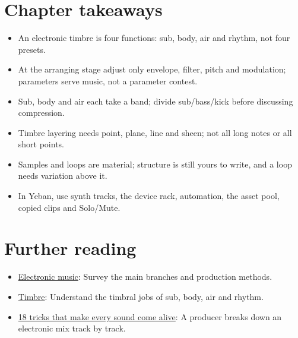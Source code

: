 \section{Chapter takeaways}
\label{sec:electronic-takeaways}

\begin{itemize}
\item An electronic timbre is four functions: sub, body, air and rhythm, not four presets.
\item At the arranging stage adjust only envelope, filter, pitch and modulation; parameters serve music, not a parameter contest.
\item Sub, body and air each take a band; divide sub/bass/kick before discussing compression.
\item Timbre layering needs point, plane, line and sheen; not all long notes or all short points.
\item Samples and loops are material; structure is still yours to write, and a loop needs variation above it.
\item In Yeban, use synth tracks, the device rack, automation, the asset pool, copied clips and Solo/Mute.
\end{itemize}

\section{Further reading}
\label{sec:08-electronic-further-reading}
\begin{itemize}
  \item \href{https://en.wikipedia.org/wiki/Electronic_music}{Electronic music}: Survey the main branches and production methods.
  \item \href{https://en.wikipedia.org/wiki/Timbre}{Timbre}: Understand the timbral jobs of sub, body, air and rhythm.
  \item \href{https://www.youtube.com/watch?v=KS89XfqFE9A}{18 tricks that make every sound come alive}: A producer breaks down an electronic mix track by track.
\end{itemize}

